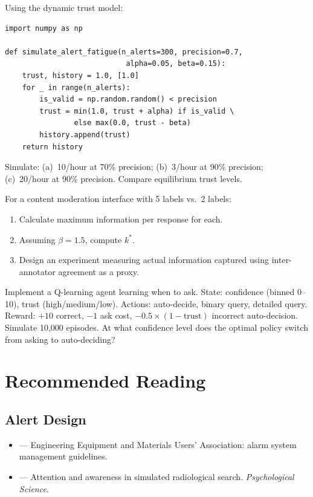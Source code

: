 \begin{Exercise}
Using the dynamic trust model:
\begin{lstlisting}[style=python, caption={Alert fatigue simulator}]
import numpy as np

def simulate_alert_fatigue(n_alerts=300, precision=0.7,
                            alpha=0.05, beta=0.15):
    trust, history = 1.0, [1.0]
    for _ in range(n_alerts):
        is_valid = np.random.random() < precision
        trust = min(1.0, trust + alpha) if is_valid \
                else max(0.0, trust - beta)
        history.append(trust)
    return history
\end{lstlisting}
Simulate: (a)~10/hour at 70\% precision; (b)~3/hour at 90\% precision; (c)~20/hour at 90\% precision. Compare equilibrium trust levels.
\end{Exercise}

\begin{Exercise}
For a content moderation interface with 5 labels vs.\ 2 labels:
\begin{enumerate}
    \item Calculate maximum information per response for each.
    \item Assuming $\beta = 1.5$, compute $k^*$.
    \item Design an experiment measuring actual information captured using inter-annotator agreement as a proxy.
\end{enumerate}
\end{Exercise}

\begin{Exercise}
Implement a Q-learning agent learning when to ask. State: confidence (binned 0--10), trust (high/medium/low). Actions: auto-decide, binary query, detailed query. Reward: $+10$ correct, $-1$ ask cost, $-0.5\times(1-\text{trust})$ incorrect auto-decision. Simulate 10{,}000 episodes. At what confidence level does the optimal policy switch from asking to auto-deciding?
\end{Exercise}

\section{Recommended Reading}

\subsection*{Alert Design}
\begin{itemize}
    \item \textcite{eemua191} --- Engineering Equipment and Materials Users' Association: alarm system management guidelines.
    \item \textcite{drew2013alarm} --- Attention and awareness in simulated radiological search. \emph{Psychological Science}.
\end{itemize}

